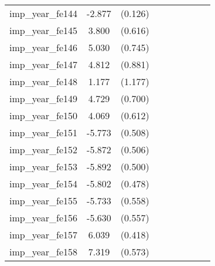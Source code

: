 {\begin{tabular}{l*{4}{cc}}
imp\_year\_fe144&   -2.877\sym{***}&  (0.126)&                  &         &                  &         &                  &         \\
imp\_year\_fe145&    3.800\sym{***}&  (0.616)&                  &         &                  &         &                  &         \\
imp\_year\_fe146&    5.030\sym{***}&  (0.745)&                  &         &                  &         &                  &         \\
imp\_year\_fe147&    4.812\sym{***}&  (0.881)&                  &         &                  &         &                  &         \\
imp\_year\_fe148&    1.177         &  (1.177)&                  &         &                  &         &                  &         \\
imp\_year\_fe149&    4.729\sym{***}&  (0.700)&                  &         &                  &         &                  &         \\
imp\_year\_fe150&    4.069\sym{***}&  (0.612)&                  &         &                  &         &                  &         \\
imp\_year\_fe151&   -5.773\sym{***}&  (0.508)&                  &         &                  &         &                  &         \\
imp\_year\_fe152&   -5.872\sym{***}&  (0.506)&                  &         &                  &         &                  &         \\
imp\_year\_fe153&   -5.892\sym{***}&  (0.500)&                  &         &                  &         &                  &         \\
imp\_year\_fe154&   -5.802\sym{***}&  (0.478)&                  &         &                  &         &                  &         \\
imp\_year\_fe155&   -5.733\sym{***}&  (0.558)&                  &         &                  &         &                  &         \\
imp\_year\_fe156&   -5.630\sym{***}&  (0.557)&                  &         &                  &         &                  &         \\
imp\_year\_fe157&    6.039\sym{***}&  (0.418)&                  &         &                  &         &                  &         \\
imp\_year\_fe158&    7.319\sym{***}&  (0.573)&                  &         &                  &         &                  &         \\

\end{tabular}}
